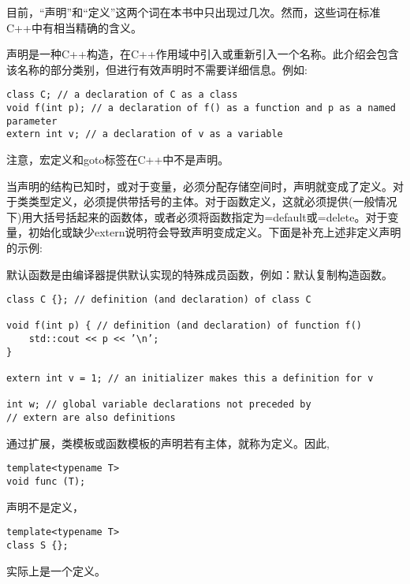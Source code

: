 
目前，“声明”和“定义”这两个词在本书中只出现过几次。然而，这些词在标准C++中有相当精确的含义。

声明是一种C++构造，在C++作用域中引入或重新引入一个名称。此介绍会包含该名称的部分类别，但进行有效声明时不需要详细信息。例如:

\begin{lstlisting}[style=styleCXX]
class C; // a declaration of C as a class
void f(int p); // a declaration of f() as a function and p as a named parameter
extern int v; // a declaration of v as a variable
\end{lstlisting}

注意，宏定义和goto标签在C++中不是声明。

当声明的结构已知时，或对于变量，必须分配存储空间时，声明就变成了定义。对于类类型定义，必须提供带括号的主体。对于函数定义，这就必须提供(一般情况下)用大括号括起来的函数体，或者必须将函数指定为=default或=delete。对于变量，初始化或缺少extern说明符会导致声明变成定义。下面是补充上述非定义声明的示例:

\begin{tcolorbox}[colback=webgreen!5!white,colframe=webgreen!75!black]
\hspace*{0.75cm}默认函数是由编译器提供默认实现的特殊成员函数，例如：默认复制构造函数。
\end{tcolorbox}

\begin{lstlisting}[style=styleCXX]
class C {}; // definition (and declaration) of class C

void f(int p) { // definition (and declaration) of function f()
	std::cout << p << ’\n’;
}

extern int v = 1; // an initializer makes this a definition for v

int w; // global variable declarations not preceded by
// extern are also definitions
\end{lstlisting}

通过扩展，类模板或函数模板的声明若有主体，就称为定义。因此,

\begin{lstlisting}[style=styleCXX]
template<typename T>
void func (T);
\end{lstlisting}

声明不是定义，

\begin{lstlisting}[style=styleCXX]
template<typename T>
class S {};
\end{lstlisting}

实际上是一个定义。

